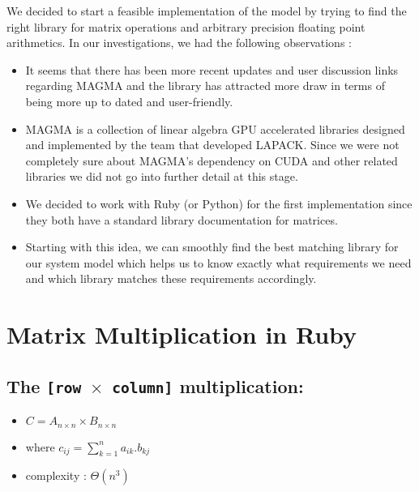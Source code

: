 \documentclass[11pt, letterpaper, oneside]{article}
\begin{document}
	We decided to start a feasible implementation of the model by trying to find the right library for matrix operations and arbitrary precision floating point arithmetics. In our investigations, we had the following observations :
	
	\begin{itemize}
	 
	\item It seems that there has been more recent updates and user discussion links regarding MAGMA and the library has attracted more draw in terms of being more up to dated and user-friendly.
	\item MAGMA is a collection of linear algebra GPU accelerated libraries designed and implemented by the team that developed LAPACK. Since we were not completely sure about MAGMA's dependency on CUDA and other related libraries we did not go into further detail at this stage.
	\item We decided to work with Ruby (or Python) for the first implementation since they both have a standard library documentation for matrices.
	\item Starting with this idea, we can smoothly find the best matching library for our system model which helps us to know exactly what requirements we need and which library matches these requirements accordingly.
	\end{itemize}





\section{Matrix Multiplication in Ruby}


\subsection{The \texttt{[row $\times$ column]} multiplication:}
	\begin{itemize}
	\item $ C = A_{n \times n} \times B_{n \times n}$
	\item where $ c_{ij} = \sum\limits_{k=1}^n a_{ik} . b_{kj}   $
	\item complexity : $\Theta(n^3)$ \\
	\end{itemize}
\end{document}
